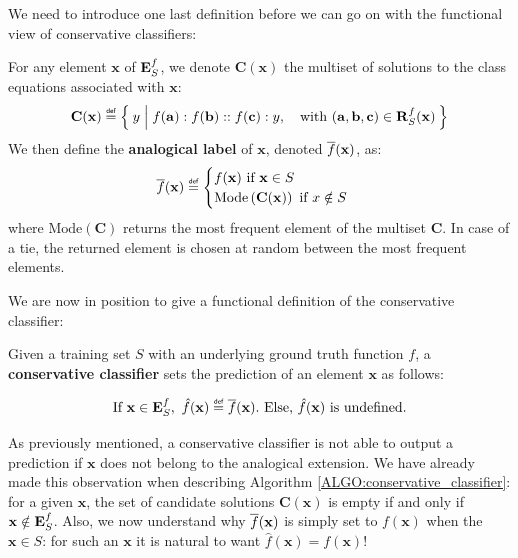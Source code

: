 We need to introduce one last definition before we can go on with the
functional view of conservative classifiers:

\begin{definition}
  \label{DEF:analogical_label}
  For any element $\mathbf{x}$ of $\mathbf{E}_{S}^{f}$, we denote $\mathbf{C}(\mathbf{x})$
  the multiset of solutions to the class equations associated with $\mathbf{x}$:
  $$\mathbf{C}(\mathbf{x}) \eqdef \Set{y | f(\mathbf{a}) : f(\mathbf{b}) ::
  f(\mathbf{c}) :y, \quad \text{with }(\mathbf{a}, \mathbf{b}, \mathbf{c}) \in \rsfx}$$
  We then define the \textbf{analogical
  label} of $\mathbf{x}$, denoted $\overline{f}(\mathbf{x})$, as:
  $$\albl{\mathbf{x}} \eqdef
  \begin{cases}
    f(\mathbf{x}) \text{ if } \mathbf{x} \in S\\
    \text{Mode} \left(\mathbf{C}(\mathbf{x})\right) \text{ if
    } x \notin S
  \end{cases}
  $$
  where $\text{Mode}(\mathbf{C})$ returns the most frequent element of the multiset
$\mathbf{C}$. In case of a tie, the returned element is chosen at random between
the most frequent elements.
\end{definition}

\noindent
We are now in position to give a functional definition of the conservative
classifier:

\begin{definition}
  \label{DEF:conservative_classifier}
  Given a training set $S$ with an underlying ground truth function $f$,
  a \textbf{conservative classifier} sets the prediction of an element $\mathbf{x}$ as
  follows:

  $$\text{If } \mathbf{x} \in \esf, ~ \hat{f}(\mathbf{x}) \eqdef \albl{\mathbf{x}}.
  \text{ Else, } \hat{f}(\mathbf{x}) \text{ is undefined.}$$
\end{definition}

As previously mentioned, a conservative classifier is not able to output a
prediction if $\mathbf{x}$ does not belong to the analogical extension. We have
already made this observation when describing Algorithm
\ref{ALGO:conservative_classifier}: for a given $\mathbf{x}$, the set of
candidate solutions $\mathbf{C}(\mathbf{x})$ is empty if and only if
$\mathbf{x} \notin \mathbf{E}_{S}^{f}$.  Also, we now understand why $\overline{f}(\mathbf{x})$ is
simply set to $f(\mathbf{x})$ when the $\mathbf{x} \in S$: for such an
$\mathbf{x}$ it is natural to want $\hat{f}(\mathbf{x}) = f(\mathbf{x})$!

